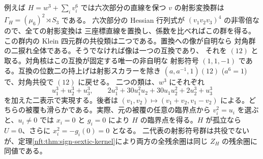 例えば $H=w^3+\sum_i v_i^6$ では六次部分の直線を保つ $v$ の射影変換群は $\Gamma_H=(\mu_6)^2\rtimes S_3$ である。
六次部分の Hessian 行列式が $(v_1v_2v_3)^4$ の非零倍なので、全ての射影変換は
三座標直線を置換し、係数を比べればこの群を得る。
この群内の Klein 四元群の共役類は二つである。置換への像が自明なら
対角群の二捩れ全体である。そうでなければ像は一つの互換であり、
それを $(12)$ と取る。対角核はこの互換が固定する唯一の非自明な
射影符号 $(1,1,-1)$ である。互換の位数二の持上げは射影スカラーを除き
$(a,a^{-1},1)(12)$ ($a^6=1$) で、対角共役で $(12)$ に戻せる。
二つの類は、$w^3$ にそれぞれ
\[
 u_1^3+u_2^3+u_3^3,\qquad
 2u_1^3+30u_1^2u_2+30u_1u_2^2+2u_2^3+u_3^3
\]
を加えた二表示で実現する。後者は $(v_1,v_2)\mapsto(v_1+v_2,v_1-v_2)$
による。どちらの被覆も滑らかである。実際、元の被覆の任意の臨界点から
$v_i^2=u_i$ を選ぶと、$u_i\ne0$ では $x_i=0$ と $g_i=0$ により
$H$ の臨界点を得る。$H$ が孤立なら $U=0$、さらに $x_i^2=-g_i(0)=0$ となる。
二代表の射影符号群は共役でないが、定理\ref{nft:thm:sign-sextic-kernel}により両方の全残余圏は同じ $Z_H$ の残余圏に同値である。

